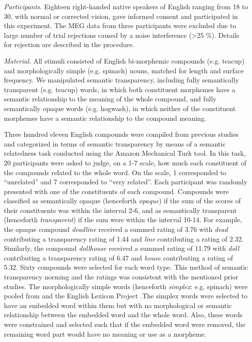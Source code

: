 \documentclass{frontiersSCNS}
\begin{document}
\textit{Participants.} Eighteen right-handed native speakers of English ranging from 18 to 30, with normal or corrected vision, gave informed consent and participated in this experiment. The MEG data from three participants were excluded due to large number of trial rejections caused by a noise interference (\textgreater 25 \%). Details for rejection are described in the procedure.

\textit{Material.}  All stimuli consisted of English bi-morphemic compounds (e.g. teacup) and morphologically simple (e.g. spinach) nouns, matched for length and surface frequency. We manipulated semantic transparency, including fully semantically transparent (e.g. teacup) words, in which both constituent morphemes have a semantic relationship to the meaning of the whole compound, and fully semantically opaque words (e.g. hogwash), in which neither of the constituent morphemes have a semantic relationship to the compound meaning.

	Three hundred eleven English compounds were compiled from previous studies \citep*{Drieghe:2010, Fiorentino:2007, Fiorentino:2009, Juhasz:2003} and categorized in terms of semantic transparency by means of a semantic relatedness task conducted using the Amazon Mechanical Turk tool. In this task, 20 participants were asked to judge, on a 1-7 scale, how much each constituent of the compounds related to the whole word.  On the scale, 1 corresponded to “unrelated” and 7 corresponded to “very related”.  Each participant was randomly presented with one of the constituents of each compound.  Compounds were classified as semantically opaque (henceforth \textit{opaque}) if the sum of the scores of their constituents was within the interval 2-6, and as semantically transparent (henceforth \textit{transparent}) if the sum were within the interval 10-14. For example, the opaque compound \textit{deadline} received a summed rating of 3.76 with \textit{dead} contributing a transparency rating of 1.44 and \textit{line} contributing a rating of 2.32. Similarly, the compound \textit{dollhouse} received a summed rating of 11.79 with \textit{doll} contributing a transparency rating of 6.47 and \textit{house} contributing a rating of 5.32. Sixty compounds were selected for each word type. This method of semantic transparency norming and the ratings was consistent with the mentioned prior studies. 
	The morphologically simple words (henceforth \textit{simplex}: e.g. spinach) were pooled from \citet{Rastle:2004} and the English Lexicon Project \citep*{Balota:2007}.The simplex words were selected to have an embedded word within them but with no morphological or semantic relationship between the embedded word and the whole word. Also, these words were constrained and selected such that if the embedded word were removed, the remaining word part would have no meaning or use as a morpheme.
 
\end{document}
